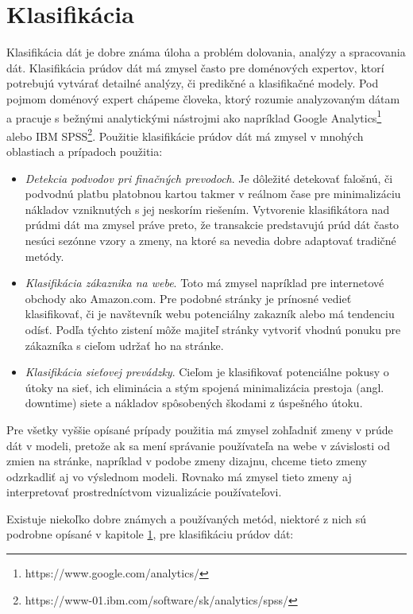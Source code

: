 \section{Klasifikácia}
\label{ulohy-klasifikacia}
Klasifikácia dát je dobre známa úloha a problém dolovania, analýzy a spracovania dát. Klasifikácia prúdov dát má zmysel často pre doménových expertov, ktorí potrebujú vytvárať detailné analýzy, či predikčné a klasifikačné modely. Pod pojmom doménový expert chápeme človeka, ktorý rozumie analyzovaným dátam a pracuje s bežnými analytickými nástrojmi ako napríklad Google Analytics\footnote{https://www.google.com/analytics/
} alebo IBM SPSS\footnote{https://www-01.ibm.com/software/sk/analytics/spss/}. Použitie klasifikácie prúdov dát má zmysel v mnohých oblastiach a prípadoch použitia:
\begin{itemize}
	\item \textit{Detekcia podvodov pri finačných prevodoch}. Je dôležité detekovať falošnú, či podvodnú platbu platobnou kartou takmer v reálnom čase pre minimalizáciu nákladov vzniknutých s jej neskorím riešením. Vytvorenie klasifikátora nad prúdmi dát ma zmysel práve preto, že transakcie predstavujú prúd dát často nesúci sezónne vzory a zmeny, na ktoré sa nevedia dobre adaptovať tradičné metódy.
	\item \textit{Klasifikácia zákaznika na webe}. Toto má zmysel napríklad pre internetové obchody ako Amazon.com. Pre podobné stránky je prínosné vedieť klasifikovať, či je navštevník webu potenciálny zakazník alebo má tendenciu odísť. Podľa týchto zistení môže majiteľ stránky vytvoriť vhodnú ponuku pre zákazníka s cieľom udržať ho na stránke.
	\item \textit{Klasifikácia sieťovej prevádzky}. Cieľom je klasifikovať potenciálne pokusy o útoky na sieť, ich eliminácia a stým spojená minimalizácia prestoja (angl. downtime) siete a nákladov spôsobených škodami z úspešného útoku.
\end{itemize}
Pre všetky vyššie opísané prípady použitia má zmysel zohľadniť zmeny v prúde dát v modeli, pretože ak sa mení správanie používateľa na webe v závislosti od zmien na stránke, napríklad v podobe zmeny dizajnu, chceme tieto zmeny odzrkadliť aj vo výslednom modeli. Rovnako má zmysel tieto zmeny aj interpretovať prostredníctvom vizualizácie používateľovi.
\par
Existuje niekoľko dobre známych a používaných metód, niektoré z nich sú podrobne opísané v kapitole \ref{ulohy-klasifikacia}, pre klasifikáciu prúdov dát:
